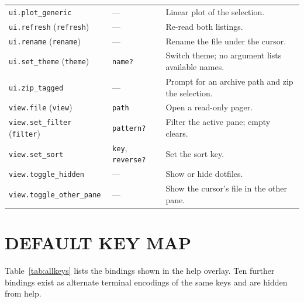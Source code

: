 \documentclass[tm]{ornltm}
\begin{document}
\begin{small}
\begin{longtable}{p{} p{} p{}}
  \texttt{ui.plot\_generic} & --- & Linear plot of the selection. \\
  \texttt{ui.refresh} (\texttt{refresh}) & --- & Re-read both listings. \\
  \texttt{ui.rename} (\texttt{rename}) & --- & Rename the file under the
    cursor. \\
  \texttt{ui.set\_theme} (\texttt{theme}) & \texttt{name?} & Switch theme; no
    argument lists available names. \\
  \texttt{ui.zip\_tagged} & --- & Prompt for an archive path and zip the
    selection. \\
  \texttt{view.file} (\texttt{view}) & \texttt{path} & Open a read-only
    pager. \\
  \texttt{view.set\_filter} (\texttt{filter}) & \texttt{pattern?} & Filter the
    active pane; empty clears. \\
  \texttt{view.set\_sort} & \texttt{key}, \texttt{reverse?} & Set the sort
    key. \\
  \texttt{view.toggle\_hidden} & --- & Show or hide dotfiles. \\
  \texttt{view.toggle\_other\_pane} & --- & Show the cursor's file in the other
    pane. \\
\end{longtable}
\end{small}

\section{DEFAULT KEY MAP}
\label{sec:appkeys}

Table~\ref{tab:allkeys} lists the bindings shown in the help overlay. Ten further
bindings exist as alternate terminal encodings of the same keys and are hidden
from help.
\end{document}
